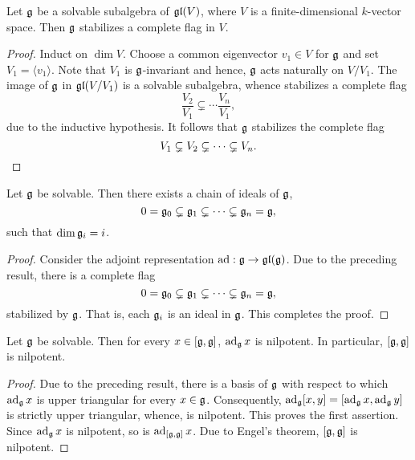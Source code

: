 \begin{corollary}
    Let $\mathfrak{g}$ be a solvable subalgebra of $\mathfrak{gl}(V)$, where $V$ is a finite-dimensional $k$-vector space. Then $\mathfrak{g}$ stabilizes a complete flag in $V$.
\end{corollary}
\begin{proof}
    Induct on $\dim V$. Choose a common eigenvector $v_1\in V$ for $\mathfrak{g}$ and set $V_1 = \langle v_1\rangle$. Note that $V_1$ is $\mathfrak{g}$-invariant and hence, $\mathfrak{g}$ acts naturally on $V/V_1$. The image of $\mathfrak{g}$ in $\mathfrak{gl}(V/V_1)$ is a solvable subalgebra, whence stabilizes a complete flag 
    \begin{equation*}
        \frac{V_2}{V_1}\subsetneq\cdots\frac{V_n}{V_1},
    \end{equation*}
    due to the inductive hypothesis. It follows that $\mathfrak{g}$ stabilizes the complete flag 
    \begin{equation*}
        V_1\subsetneq V_2\subsetneq\dots\subsetneq V_n.\qedhere
    \end{equation*}
\end{proof}

\begin{corollary}
    Let $\mathfrak{g}$ be solvable. Then there exists a chain of ideals of $\mathfrak{g}$, 
    \begin{equation*}
        0 = \mathfrak{g}_0\subsetneq\mathfrak{g}_1\subsetneq\dots\subsetneq\mathfrak{g}_n = \mathfrak{g},
    \end{equation*}
    such that $\dim\mathfrak{g}_i = i$.
\end{corollary}
\begin{proof}
    Consider the adjoint representation $\operatorname{ad}:\mathfrak{g}\to\mathfrak{gl}(\mathfrak{g})$. Due to the preceding result, there is a complete flag 
    \begin{equation*}
        0 = \mathfrak{g}_0\subsetneq\mathfrak{g}_1\subsetneq\dots\subsetneq\mathfrak{g}_n = \mathfrak{g},
    \end{equation*}
    stabilized by $\mathfrak{g}$. That is, each $\mathfrak{g}_i$ is an ideal in $\mathfrak{g}$. This completes the proof.
\end{proof}

\begin{corollary}
    Let $\mathfrak{g}$ be solvable. Then for every $x\in[\mathfrak{g},\mathfrak{g}]$, $\operatorname{ad}_{\mathfrak{g}} x$ is nilpotent. In particular, $[\mathfrak{g},\mathfrak{g}]$ is nilpotent.
\end{corollary}
\begin{proof}
    Due to the preceding result, there is a basis of $\mathfrak{g}$ with respect to which $\operatorname{ad}_{\mathfrak{g}} x$ is upper triangular for every $x\in\mathfrak{g}$. Consequently, $\operatorname{ad}_{\mathfrak{g}} [x, y] = [\operatorname{ad}_{\mathfrak{g}} x, \operatorname{ad}_{\mathfrak{g}} y]$ is strictly upper triangular, whence, is nilpotent. This proves the first assertion. Since $\operatorname{ad}_{\mathfrak{g}} x$ is nilpotent, so is $\operatorname{ad}_{[\mathfrak{g},\mathfrak{g}]} x$. Due to Engel's theorem, $[\mathfrak{g},\mathfrak{g}]$ is nilpotent.
\end{proof}

